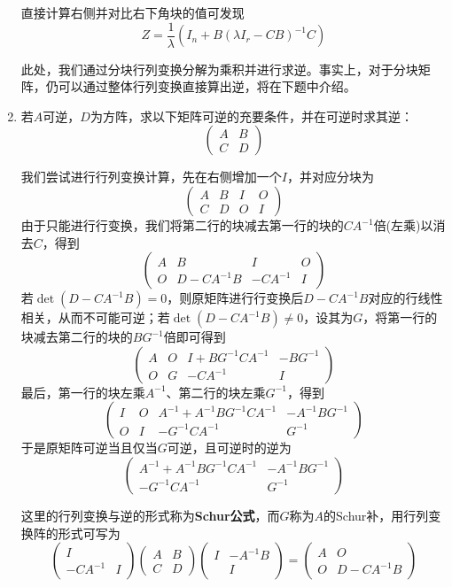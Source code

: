 \documentclass[a4paper,UTF8,fontset=windows]{ctexart}
\newcommand*{\note}{\noindent *}
\begin{document}
\begin{enumerate}
    直接计算右侧并对比右下角块的值可发现
    $$Z=\frac{1}{\lambda}(I_n+B(\lambda I_r-CB)^{-1}C)$$

    \note 此处，我们通过分块行列变换分解为乘积并进行求逆。事实上，对于分块矩阵，仍可以通过整体行列变换直接算出逆，将在下题中介绍。

    \item 若$A$可逆，$D$为方阵，求以下矩阵可逆的充要条件，并在可逆时求其逆：
    $$\begin{pmatrix}A&B\\C&D\end{pmatrix}$$

    我们尝试进行行列变换计算，先在右侧增加一个$I$，并对应分块为
    $$\begin{pmatrix}A&B&I&O\\C&D&O&I\end{pmatrix}$$
    由于只能进行行变换，我们将第二行的块减去第一行的块的$CA^{-1}$倍(左乘)以消去$C$，得到
    $$\begin{pmatrix}A&B&I&O\\O&D-CA^{-1}B&-CA^{-1}&I\end{pmatrix}$$
    若$\det(D-CA^{-1}B)=0$，则原矩阵进行行变换后$D-CA^{-1}B$对应的行线性相关，从而不可能可逆；若$\det(D-CA^{-1}B)\ne0$，设其为$G$，将第一行的块减去第二行的块的$BG^{-1}$倍即可得到
    $$\begin{pmatrix}A&O&I+BG^{-1}CA^{-1}&-BG^{-1}\\O&G&-CA^{-1}&I\end{pmatrix}$$
    最后，第一行的块左乘$A^{-1}$、第二行的块左乘$G^{-1}$，得到
    $$\begin{pmatrix}I&O&A^{-1}+A^{-1}BG^{-1}CA^{-1}&-A^{-1}BG^{-1}\\O&I&-G^{-1}CA^{-1}&G^{-1}\end{pmatrix}$$
    于是原矩阵可逆当且仅当$G$可逆，且可逆时的逆为
    $$\begin{pmatrix}A^{-1}+A^{-1}BG^{-1}CA^{-1}&-A^{-1}BG^{-1}\\-G^{-1}CA^{-1}&G^{-1}\end{pmatrix}$$

    \note 这里的行列变换与逆的形式称为\textbf{Schur公式}，而$G$称为$A$的Schur补，用行列变换阵的形式可写为
    $$\begin{pmatrix}I&\\-CA^{-1}&I\end{pmatrix}\begin{pmatrix}A&B\\C&D\end{pmatrix}\begin{pmatrix}I&-A^{-1}B\\ &I\end{pmatrix}=\begin{pmatrix}A&O\\O&D-CA^{-1}B\end{pmatrix}$$


\end{enumerate}
\end{document}
